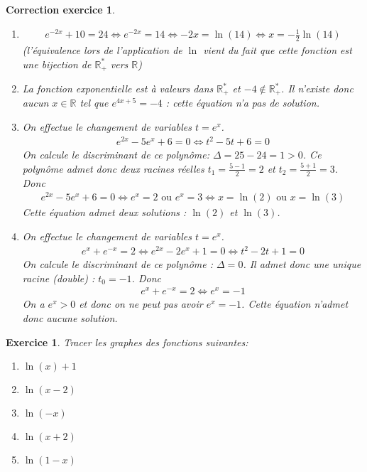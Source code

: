 \documentclass[12pt]{article}
\newtheorem{exercice}{\bf Exercice}
\newtheorem{correction}{\bf Correction exercice}
\newenvironment{exo}{
\begin{exercice}\smallskip\normalfont}{\end{exercice}
}
\newenvironment{cor}{
\begin{correction}\smallskip\normalfont}{\end{correction}
}
\newcommand*{\R}{\mathbb{R}}
\begin{document}
\begin{cor}
\begin{enumerate}
\item
  \begin{align*}
    e^{-2x} + 10 = 24
    \iff
    e^{-2x} = 14
    \iff
    -2x = \ln(14)
    \iff
    x = - \frac12 \ln(14)
  \end{align*}
  (l'\'equivalence lors de l'application de $\ln$ vient du fait que cette fonction
  est une bijection de $\R_+^*$ vers $\R$)

\item La fonction exponentielle est \`a valeurs dans $\R_+^*$ et $-4 \notin \R_+^*$.
  Il n'existe donc aucun $x \in \R$ tel que $e^{4x+5} = -4$ : cette \'equation n'a pas de solution.

\item On effectue le changement de variables $t = e^x$.
  \begin{align*}
    e^{2x} - 5 e^{x} + 6 = 0
    \iff
    t^2 - 5 t + 6 = 0
  \end{align*}
  On calcule le discriminant de ce polyn\^ome:
  $\Delta = 25 - 24 = 1 > 0$.
  Ce polyn\^ome admet donc deux racines r\'eelles
  $t_1 = \frac{5-1}{2} = 2$ et $t_2 = \frac{5+1}{2} = 3$.
  Donc 
  \begin{align*}
    e^{2x} - 5 e^{x} + 6 = 0
    \iff
    e^x = 2 \text{  ou  } e^x = 3
    \iff
    x = \ln(2) \text{  ou  } x = \ln(3)
  \end{align*}
  Cette \'equation admet deux solutions : $\ln(2)$ et $\ln(3)$.
\item On effectue le changement de variables $t = e^x$.
  \begin{align*}
    e^x + e^{-x} = 2
    \iff
    e^{2x} - 2 e^x + 1 = 0
    \iff
    t^2 - 2 t + 1 = 0
  \end{align*}
  On calcule le discriminant de ce polyn\^ome :
  $\Delta = 0$. Il admet donc une unique racine (double) : $t_0 = -1$.
  Donc
  \begin{align*}
    e^x + e^{-x} = 2
    \iff
    e^x = -1
  \end{align*}
  On a $e^x > 0$ et donc on ne peut pas avoir $e^x = -1$.
  Cette \'equation n'admet donc aucune solution.
\end{enumerate}
\end{cor}
\color{black}
\fi


\begin{exo} Tracer les graphes des fonctions suivantes:
\begin{multicols}{5}
\begin{enumerate}
\item $\ln(x)+1$
\item $\ln(x-2)$
\item $\ln(-x)$
\item $\ln(x+2)$
\item $\ln(1-x)$
\end{enumerate}
\end{multicols}
\end{exo}
\end{document}
